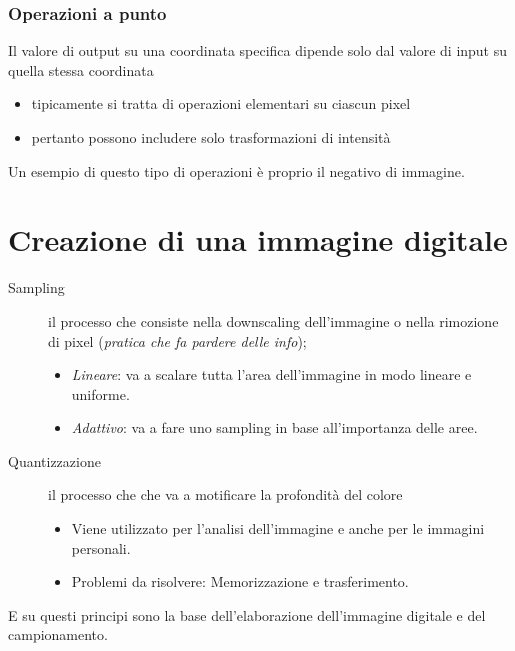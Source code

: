 \documentclass{report}
\begin{document}
\subsubsection{Operazioni a punto}
\label{sec:opapunto}

Il valore di output su una coordinata specifica dipende solo dal valore di input su quella stessa coordinata
\begin{itemize}
\item tipicamente si tratta di operazioni elementari su ciascun pixel
\item pertanto possono includere solo trasformazioni di intensità
\end{itemize}
Un esempio di questo tipo di operazioni è proprio il negativo di
immagine.
\section{Creazione di una immagine digitale}
\label{sec:creadiunimgdig}

\begin{description}
\item[Sampling] il processo che consiste nella downscaling dell'immagine
  o nella rimozione di pixel (\textit{pratica che fa pardere
    delle info});
  \begin{itemize}
  \item \textit{Lineare}: va a scalare tutta l'area dell'immagine in
    modo lineare e uniforme.
  \item \textit{Adattivo}: va a fare uno sampling in base all'importanza
    delle aree.
  \end{itemize}
\item[Quantizzazione] il processo che che va a motificare la profondità
  del colore
  \begin{itemize}
  \item Viene utilizzato per l'analisi dell'immagine e anche per le
    immagini personali.
  \item Problemi da risolvere: Memorizzazione e trasferimento.
  \end{itemize}
\end{description}
E su questi principi sono la base dell'elaborazione dell'immagine
digitale e del campionamento.
\end{document}
